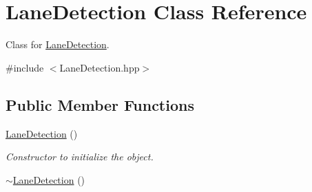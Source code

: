 \hypertarget{class_lane_detection}{}\section{Lane\+Detection Class Reference}
\label{class_lane_detection}


Class for \hyperlink{class_lane_detection}{Lane\+Detection}.  




{\ttfamily \#include $<$Lane\+Detection.\+hpp$>$}

\subsection*{Public Member Functions}
\begin{DoxyCompactItemize}
\item 
\hyperlink{class_lane_detection_a731f54ebd16a6ad77ff51e413415d1d9}{Lane\+Detection} ()
\begin{DoxyCompactList}\small\item\em Constructor to initialize the object. \end{DoxyCompactList}\item 
\hyperlink{class_lane_detection_afdccabf18bc0137fafb973624e8c3df3}{$\sim$\+Lane\+Detection} ()\hypertarget{class_lane_detection_afdccabf18bc0137fafb973624e8c3df3}{}\label{class_lane_detection_afdccabf18bc0137fafb973624e8c3df3}


\end{DoxyCompactItemize}
